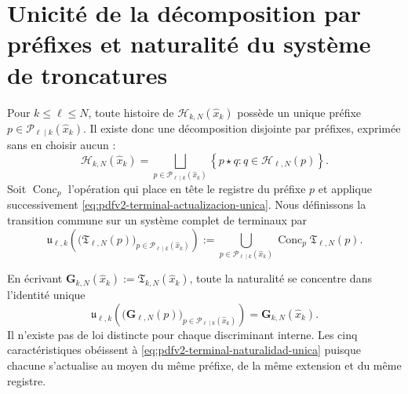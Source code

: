 \section{Unicité de la décomposition par préfixes et naturalité du système de troncatures}

Pour \(k\leq\ell\leq N\), toute histoire de \(\mathscr H_{k,N}(\widehat x_k)\) possède un unique préfixe \(p\in\mathscr P_{\ell\mid k}(\widehat x_k)\). Il existe donc une décomposition disjointe par préfixes, exprimée sans en choisir aucun :
\begin{equation}
\label{eq:pdfv2-terminal-particion-historias}
 \mathscr H_{k,N}(\widehat x_k)
 =\bigsqcup_{p\in\mathscr P_{\ell\mid k}(\widehat x_k)}
 \left\{p\star q:q\in\mathscr H_{\ell,N}(p)\right\}.
\end{equation}
Soit \(\operatorname{Conc}_p\) l'opération qui place en tête le registre du préfixe \(p\) et applique successivement \eqref{eq:pdfv2-terminal-actualizacion-unica}. Nous définissons la transition commune sur un système complet de terminaux par
\begin{equation}
\label{eq:pdfv2-terminal-transicion-comun}
 \mathfrak u_{\ell,k}
 \left(
   \bigl(\mathfrak T_{\ell,N}(p)\bigr)_{p\in\mathscr P_{\ell\mid k}(\widehat x_k)}
 \right)
 :=\bigcup_{p\in\mathscr P_{\ell\mid k}(\widehat x_k)}
   \operatorname{Conc}_p\mathfrak T_{\ell,N}(p).
\end{equation}

En écrivant \(\mathbf G_{k,N}(\widehat x_k):=\mathfrak T_{k,N}(\widehat x_k)\), toute la naturalité se concentre dans l'identité unique
\begin{equation}
\label{eq:pdfv2-terminal-naturalidad-unica}
 \boxed{
 \mathfrak u_{\ell,k}
 \left(
   \bigl(\mathbf G_{\ell,N}(p)\bigr)_{p\in\mathscr P_{\ell\mid k}(\widehat x_k)}
 \right)
 =\mathbf G_{k,N}(\widehat x_k).}
\end{equation}
Il n'existe pas de loi distincte pour chaque discriminant interne. Les cinq caractéristiques obéissent à \eqref{eq:pdfv2-terminal-naturalidad-unica} puisque chacune s'actualise au moyen du même préfixe, de la même extension et du même registre.

